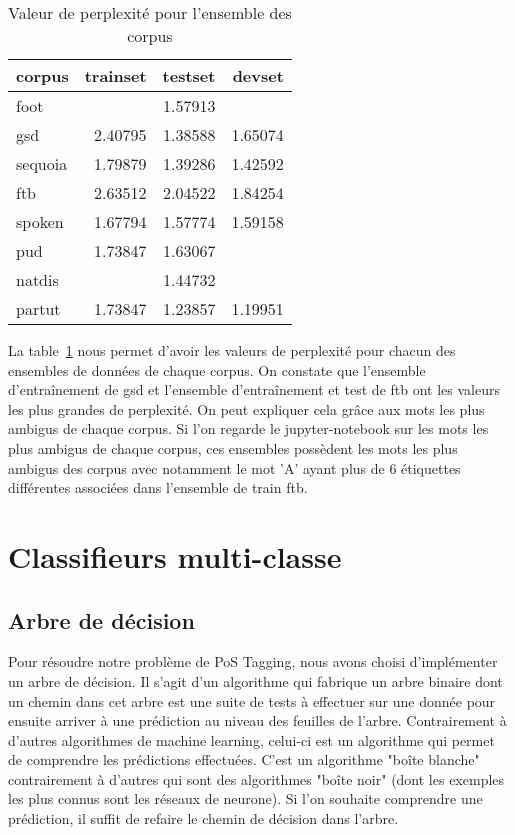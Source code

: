 \documentclass[french, 14pt]{memoir}
\begin{document}
\begin{table}
\begin{center}
\begin{tabular}{|l|r|r|r|}
\hline
corpus & trainset & testset & devset \\
\hline
 foot    &         & 1.57913 &         \\
 gsd     & 2.40795 & 1.38588 & 1.65074 \\
 sequoia & 1.79879 & 1.39286 & 1.42592 \\
 ftb     & 2.63512 & 2.04522 & 1.84254 \\
 spoken  & 1.67794 & 1.57774 & 1.59158 \\
 pud     & 1.73847 & 1.63067 &         \\
 natdis  &         & 1.44732 &         \\
 partut  & 1.73847 & 1.23857 & 1.19951 \\
\hline
\end{tabular}
\end{center}
\caption{Valeur de perplexité pour l'ensemble des corpus}
\label{perplexityTable}
\end{table}

La table~\ref{perplexityTable} nous permet d'avoir les valeurs de perplexité pour chacun des ensembles de données de chaque corpus. On constate que l'ensemble d'entraînement de gsd et l'ensemble d'entraînement et test de ftb ont les valeurs les plus grandes de perplexité. On peut expliquer cela grâce aux mots les plus ambigus de chaque corpus. Si l'on regarde le jupyter-notebook sur les mots les plus ambigus de chaque corpus, ces ensembles possèdent les mots les plus ambigus des corpus avec notamment le mot 'A' ayant plus de 6 étiquettes différentes associées dans l'ensemble de train ftb.

\chapter{Classifieurs multi-classe}
\section{Arbre de décision}

Pour résoudre notre problème de PoS Tagging, nous avons choisi d'implémenter un arbre de décision. Il s'agit d'un algorithme qui fabrique un arbre binaire dont un chemin dans cet arbre est une suite de tests à effectuer sur une donnée pour ensuite arriver à une prédiction au niveau des feuilles de l'arbre. Contrairement à d'autres algorithmes de machine learning, celui-ci est un algorithme qui permet de comprendre les prédictions effectuées. C'est un algorithme "boîte blanche" contrairement à d'autres qui sont des algorithmes "boîte noir" (dont les exemples les plus connus sont les réseaux de neurone). 
Si l'on souhaite comprendre une prédiction, il suffit de refaire le chemin de décision dans l'arbre. 
\end{document}
